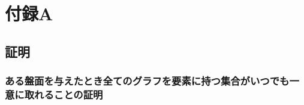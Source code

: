 \chapter{付録A}
\label{chap:AppendixA}


\section{証明}
\subsection{ある盤面を与えたとき全てのグラフを要素に持つ集合がいつでも一意に取れることの証明}\label{subsection:GraphIsUniqueProof}